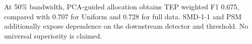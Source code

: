 At 50\% bandwidth, PCA-guided allocation obtains TEP weighted F1 0.675, compared with 0.707 for Uniform and 0.728 for full data. SMD-1-1 and PSM additionally expose dependence on the downstream detector and threshold. No universal superiority is claimed.
